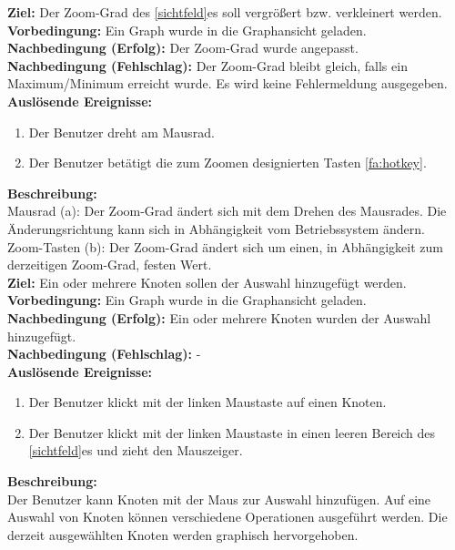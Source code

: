 \label{fa:zoom}
\textbf{Ziel:} Der Zoom-Grad des \ref{sichtfeld}es soll vergrößert bzw. verkleinert werden.\\
\textbf{Vorbedingung:} Ein Graph wurde in die Graphansicht geladen.\\
\textbf{Nachbedingung (Erfolg):} Der Zoom-Grad wurde angepasst.\\
\textbf{Nachbedingung (Fehlschlag):} Der Zoom-Grad bleibt gleich, falls ein Maximum/Minimum erreicht wurde. Es wird keine Fehlermeldung ausgegeben.\\
\textbf{Auslösende Ereignisse:}
\begin{enumerate}[nolistsep, label=(\alph*)]
  \item Der Benutzer dreht am Mausrad.
  \item Der Benutzer betätigt die zum Zoomen designierten Tasten \ref{fa:hotkey}.
\end{enumerate}
\textbf{Beschreibung:}\\
Mausrad (a): Der Zoom-Grad ändert sich mit dem Drehen des Mausrades. Die Änderungsrichtung kann sich in Abhängigkeit vom Betriebssystem ändern.\\
Zoom-Tasten (b): Der Zoom-Grad ändert sich um einen, in Abhängigkeit zum derzeitigen Zoom-Grad, festen Wert.\\

\label{fa:selekt_knoten}
\textbf{Ziel:} Ein oder mehrere Knoten sollen der Auswahl hinzugefügt werden.\\
\textbf{Vorbedingung:} Ein Graph wurde in die Graphansicht geladen.\\
\textbf{Nachbedingung (Erfolg):} Ein oder mehrere Knoten wurden der Auswahl hinzugefügt.\\
\textbf{Nachbedingung (Fehlschlag):} -\\
\textbf{Auslösende Ereignisse:}
\begin{enumerate}[nolistsep, label=(\alph*)]
  \item Der Benutzer klickt mit der linken Maustaste auf einen Knoten.
  \item Der Benutzer klickt mit der linken Maustaste in einen leeren Bereich des \ref{sichtfeld}es und zieht den Mauszeiger.
\end{enumerate}
\textbf{Beschreibung:}\\
Der Benutzer kann Knoten mit der Maus zur Auswahl hinzufügen.
Auf eine Auswahl von Knoten können verschiedene Operationen ausgeführt werden. %
Die derzeit ausgewählten Knoten werden graphisch hervorgehoben.\\

